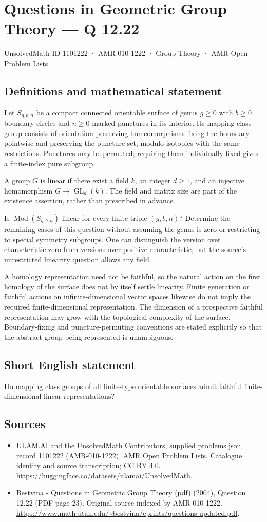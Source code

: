 \documentclass[11pt,a4paper]{article}
\begin{document}
\section*{Questions in Geometric Group Theory — Q 12.22}\label{1101222}
{\small UnsolvedMath ID 1101222 · AMR-010-1222 · Group Theory · AMR Open Problem Lists}
\subsection{Definitions and mathematical statement}
Let $S_{g,b,n}$ be a compact connected orientable surface of genus $g\geq0$ with $b\geq0$ boundary circles and $n\geq0$ marked punctures in its interior. Its mapping class group consists of orientation-preserving homeomorphisms fixing the boundary pointwise and preserving the puncture set, modulo isotopies with the same restrictions. Punctures may be permuted; requiring them individually fixed gives a finite-index pure subgroup.

A group $G$ is linear if there exist a field $k$, an integer $d\geq1$, and an injective homomorphism $G\to\operatorname{GL}_d(k)$. The field and matrix size are part of the existence assertion, rather than prescribed in advance.

Is $\operatorname{Mod}(S_{g,b,n})$ linear for every finite triple $(g,b,n)$? Determine the remaining cases of this question without assuming the genus is zero or restricting to special symmetry subgroups. One can distinguish the version over characteristic zero from versions over positive characteristic, but the source's unrestricted linearity question allows any field.

A homology representation need not be faithful, so the natural action on the first homology of the surface does not by itself settle linearity. Finite generation or faithful actions on infinite-dimensional vector spaces likewise do not imply the required finite-dimensional representation. The dimension of a prospective faithful representation may grow with the topological complexity of the surface. Boundary-fixing and puncture-permuting conventions are stated explicitly so that the abstract group being represented is unambiguous.
\subsection{Short English statement}
Do mapping class groups of all finite-type orientable surfaces admit faithful finite-dimensional linear representations?
\subsection{Sources}
\begin{itemize}
\item[S1] ULAM.AI and the UnsolvedMath Contributors, supplied problems.json, record 1101222 (AMR-010-1222), AMR Open Problem Lists. Catalogue identity and source transcription; CC BY 4.0.
\url{https://huggingface.co/datasets/ulamai/UnsolvedMath}.
\item[S2] Bestvina - Questions in Geometric Group Theory (pdf) (2004), Question 12.22 (PDF page 23). Original source indexed by AMR-010-1222.
\url{https://www.math.utah.edu/~bestvina/eprints/questions-updated.pdf}.
\end{itemize}
\end{document}
